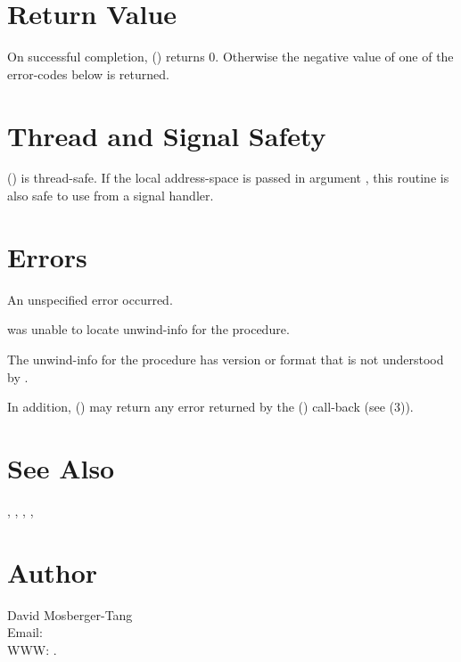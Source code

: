 \documentclass{article}
\begin{document}
\section{Return Value}

On successful completion, ()
returns 0.  Otherwise the negative value of one of the error-codes
below is returned.

\section{Thread and Signal Safety}

() is thread-safe.  If the local
address-space is passed in argument , this routine is also
safe to use from a signal handler.

\section{Errors}

\begin{Description}
\item[\Const{UNW\_EUNSPEC}] An unspecified error occurred.
\item[\Const{UNW\_ENOINFO}]  was unable to locate
  unwind-info for the procedure.
\item[\Const{UNW\_EBADVERSION}] The unwind-info for the procedure has
  version or format that is not understood by .
\end{Description}
In addition, () may return any
error returned by the () call-back (see
(3)).

\section{See Also}

,
,
,
,

\section{Author}

\noindent
David Mosberger-Tang\\
Email: \\
WWW: .
\LatexManEnd
\end{document}
